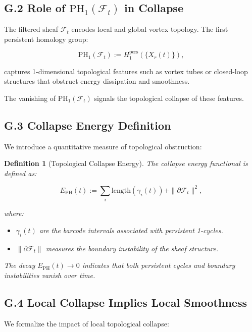 \documentclass[11pt]{article}
\newtheorem{definition}[theorem]{Definition}
\begin{document}
\subsection*{G.2 Role of \( \mathrm{PH}_1(\mathcal{F}_t) \) in Collapse}

The filtered sheaf \( \mathcal{F}_t \) encodes local and global vortex topology. The first persistent homology group:

\[
\mathrm{PH}_1(\mathcal{F}_t) := H_1^{\mathrm{pers}} \left( \{ X_r(t) \} \right),
\]

captures 1-dimensional topological features such as vortex tubes or closed-loop structures that obstruct energy dissipation and smoothness.

The vanishing of \( \mathrm{PH}_1(\mathcal{F}_t) \) signals the topological collapse of these features.

\subsection*{G.3 Collapse Energy Definition}

We introduce a quantitative measure of topological obstruction:

\begin{definition}[Topological Collapse Energy]
The collapse energy functional is defined as:

\[
E_{\mathrm{PH}}(t) := \sum_{i} \mathrm{length}(\gamma_i(t)) + \| \partial \mathcal{F}_t \|^2,
\]

where:

\begin{itemize}
  \item \( \gamma_i(t) \) are the barcode intervals associated with persistent 1-cycles.
  \item \( \| \partial \mathcal{F}_t \| \) measures the boundary instability of the sheaf structure.
\end{itemize}

The decay \( E_{\mathrm{PH}}(t) \to 0 \) indicates that both persistent cycles and boundary instabilities vanish over time.
\end{definition}

\subsection*{G.4 Local Collapse Implies Local Smoothness}

We formalize the impact of local topological collapse:
\end{document}
